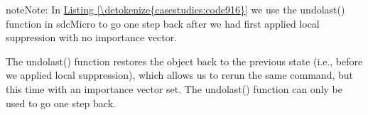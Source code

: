 \documentclass[letterpaper,10pt,english]{sphinxmanual}
\begin{document}
\begin{sphinxadmonition}{note}{Note:}
In \hyperref[\detokenize{casestudies:code916}]{Listing \ref{\detokenize{casestudies:code916}}} we use the undolast() function in sdcMicro to go one step back after we had first
applied local suppression with no importance vector.
\end{sphinxadmonition}

The undolast() function restores the  object back to the previous state
(i.e., before we applied local suppression), which allows us to rerun
the same command, but this time with an importance vector set. The
undolast() function can only be used to go one step back.

\def\sphinxLiteralBlockLabel{\label{\detokenize{casestudies:code916}}}
%
\end{document}
